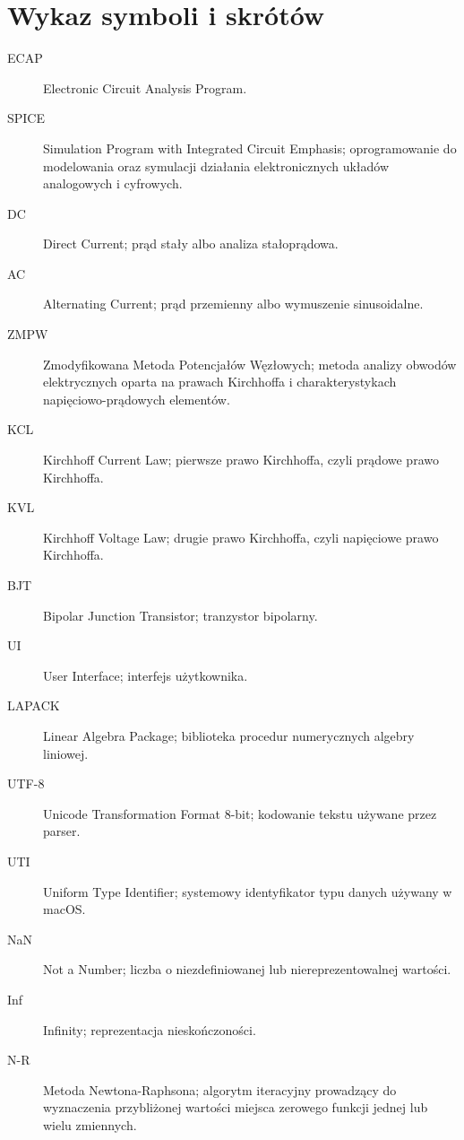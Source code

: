 \chapter*{Wykaz symboli i skrótów}

\begin{description}
  \item[ECAP] Electronic Circuit Analysis Program.
  \item[SPICE] Simulation Program with Integrated Circuit Emphasis; oprogramowanie do modelowania oraz symulacji działania elektronicznych układów analogowych i cyfrowych.
  \item[DC] Direct Current; prąd stały albo analiza stałoprądowa.
  \item[AC] Alternating Current; prąd przemienny albo wymuszenie sinusoidalne.
  \item[ZMPW] Zmodyfikowana Metoda Potencjałów Węzłowych; metoda analizy obwodów elektrycznych oparta na prawach Kirchhoffa i charakterystykach napięciowo-prądowych elementów.
  \item[KCL] Kirchhoff Current Law; pierwsze prawo Kirchhoffa, czyli prądowe prawo Kirchhoffa.
  \item[KVL] Kirchhoff Voltage Law; drugie prawo Kirchhoffa, czyli napięciowe prawo Kirchhoffa.
  \item[BJT] Bipolar Junction Transistor; tranzystor bipolarny.
  \item[UI] User Interface; interfejs użytkownika.
  \item[LAPACK] Linear Algebra Package; biblioteka procedur numerycznych algebry liniowej.
  \item[UTF-8] Unicode Transformation Format 8-bit; kodowanie tekstu używane przez parser.
  \item[UTI] Uniform Type Identifier; systemowy identyfikator typu danych używany w macOS.
  \item[NaN] Not a Number; liczba o niezdefiniowanej lub niereprezentowalnej wartości.
  \item[Inf] Infinity; reprezentacja nieskończoności.
  \item[N-R] Metoda Newtona-Raphsona; algorytm iteracyjny prowadzący do wyznaczenia przybliżonej wartości miejsca zerowego funkcji jednej lub wielu zmiennych.
\end{description}
